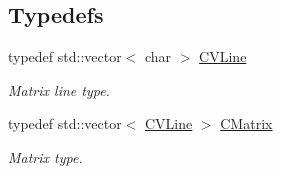 \subsection*{Typedefs}
\begin{DoxyCompactItemize}
\item 
typedef std\-::vector$<$ char $>$ \hyperlink{namespace_chase_game_aa09cf1806d3b1f59d36cfabadeaca6a2}{C\-V\-Line}
\begin{DoxyCompactList}\small\item\em Matrix line type. \end{DoxyCompactList}\item 
typedef std\-::vector$<$ \hyperlink{namespace_chase_game_aa09cf1806d3b1f59d36cfabadeaca6a2}{C\-V\-Line} $>$ \hyperlink{namespace_chase_game_a469449f9237e59efce3982127366c550}{C\-Matrix}
\begin{DoxyCompactList}\small\item\em Matrix type. \end{DoxyCompactList}\end{DoxyCompactItemize}
